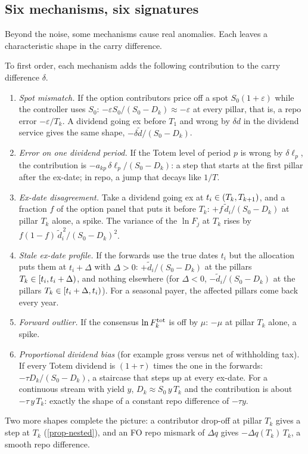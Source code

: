 \subsection{Six mechanisms, six signatures}\label{sec-signatures}
Beyond the noise, some mechanisms cause real anomalies. Each leaves a characteristic shape in the carry difference.

\begin{proposition}[Signatures]\label{prop-signatures}
To first order, each mechanism adds the following contribution to the carry difference $\delta$.
\begin{enumerate}[label=(\roman*)]
\item \emph{Spot mismatch.} If the option contributors price off a spot $S_0(1+\varepsilon)$ while the controller uses
$S_0$: $-\varepsilon S_0/(S_0-D_k)\approx-\varepsilon$ at every pillar, that is, a repo error $-\varepsilon/T_k$. A
dividend going ex before $T_1$ and wrong by $\delta d$ in the dividend service gives the same shape,
$-\delta\tilde d/(S_0-D_k)$.
\item \emph{Error on one dividend period.} If the Totem level of period $p$ is wrong by $\delta\ell_p$, the
contribution is $-a_{kp}\,\delta\ell_p/(S_0-D_k)$: a step that starts at the first pillar after the ex-date; in repo, a
jump that decays like $1/T$.
\item \emph{Ex-date disagreement.} Take a dividend going ex at $t_i\in\mathopen{(}T_k, T_{k+1}\mathclose{)}$, and a fraction $f$ of the
option panel that puts it before $T_k$: $+f\,\tilde d_i/(S_0-D_k)$ at pillar $T_k$ alone, a spike. The variance of the
$\ln F_j$ at $T_k$ rises by $f(1-f)\,\tilde d_i^{\,2}/(S_0-D_k)^2$.
\item \emph{Stale ex-date profile.} If the forwards use the true dates $t_i$ but the allocation puts them at
$t_i+\Delta$ with $\Delta>0$: $+\tilde d_i/(S_0-D_k)$ at the pillars $T_k\in\mathopen{[}t_i, t_i+\Delta\mathclose{)}$, and nothing
elsewhere (for $\Delta<0$, $-\tilde d_i/(S_0-D_k)$ at the pillars $T_k\in\mathopen{[}t_i+\Delta, t_i\mathclose{)}$). For a seasonal
payer, the affected pillars come back every year.
\item \emph{Forward outlier.} If the consensus $\ln F^{\mathrm{tot}}_k$ is off by $\mu$: $-\mu$ at pillar $T_k$ alone, a
spike.
\item \emph{Proportional dividend bias} (for example gross versus net of withholding tax). If every Totem dividend is
$(1+\tau)$ times the one in the forwards: $-\tau D_k/(S_0-D_k)$, a staircase that steps up at every ex-date. For a
continuous stream with yield $y$, $D_k\approx S_0\,y\,T_k$ and the contribution is about $-\tau\,y\,T_k$: exactly the
shape of a constant repo difference of $-\tau y$.
\end{enumerate}
Two more shapes complete the picture: a contributor drop-off at pillar $T_k$ gives a step at $T_k$
(\cref{prop-nested}), and an FO repo mismark of $\Delta q$ gives $-\Delta q(T_k)\,T_k$, a smooth repo difference.
\end{proposition}
